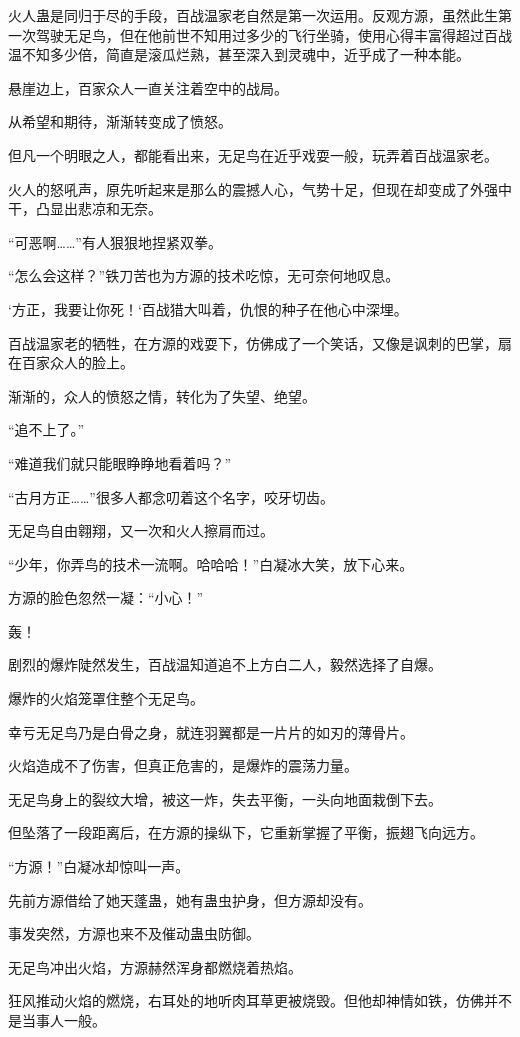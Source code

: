\begin{this_body}
火人蛊是同归于尽的手段，百战温家老自然是第一次运用。反观方源，虽然此生第一次驾驶无足鸟，但在他前世不知用过多少的飞行坐骑，使用心得丰富得超过百战温不知多少倍，简直是滚瓜烂熟，甚至深入到灵魂中，近乎成了一种本能。

悬崖边上，百家众人一直关注着空中的战局。

从希望和期待，渐渐转变成了愤怒。

但凡一个明眼之人，都能看出来，无足鸟在近乎戏耍一般，玩弄着百战温家老。

火人的怒吼声，原先听起来是那么的震撼人心，气势十足，但现在却变成了外强中干，凸显出悲凉和无奈。

“可恶啊……”有人狠狠地捏紧双拳。

“怎么会这样？”铁刀苦也为方源的技术吃惊，无可奈何地叹息。

‘方正，我要让你死！‘百战猎大叫着，仇恨的种子在他心中深埋。

百战温家老的牺牲，在方源的戏耍下，仿佛成了一个笑话，又像是讽刺的巴掌，扇在百家众人的脸上。

渐渐的，众人的愤怒之情，转化为了失望、绝望。

“追不上了。”

“难道我们就只能眼睁睁地看着吗？”

“古月方正……”很多人都念叨着这个名字，咬牙切齿。

无足鸟自由翱翔，又一次和火人擦肩而过。

“少年，你弄鸟的技术一流啊。哈哈哈！”白凝冰大笑，放下心来。

方源的脸色忽然一凝：“小心！”

轰！

剧烈的爆炸陡然发生，百战温知道追不上方白二人，毅然选择了自爆。

爆炸的火焰笼罩住整个无足鸟。

幸亏无足鸟乃是白骨之身，就连羽翼都是一片片的如刃的薄骨片。

火焰造成不了伤害，但真正危害的，是爆炸的震荡力量。

无足鸟身上的裂纹大增，被这一炸，失去平衡，一头向地面栽倒下去。

但坠落了一段距离后，在方源的操纵下，它重新掌握了平衡，振翅飞向远方。

“方源！”白凝冰却惊叫一声。

先前方源借给了她天蓬蛊，她有蛊虫护身，但方源却没有。

事发突然，方源也来不及催动蛊虫防御。

无足鸟冲出火焰，方源赫然浑身都燃烧着热焰。

狂风推动火焰的燃烧，右耳处的地听肉耳草更被烧毁。但他却神情如铁，仿佛并不是当事人一般。


\end{this_body}
